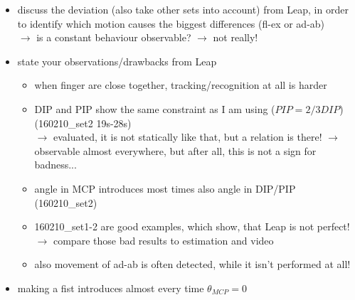 	\begin{itemize}
	
		
	\item discuss the deviation (also take other sets into account) from Leap, in order to identify which motion causes the biggest differences (fl-ex or ad-ab)\\
		$ \rightarrow $ is a constant behaviour observable? $ \rightarrow $ not really!
	\item state your observations/drawbacks from Leap 
		\begin{itemize}
		\item when finger are close together, tracking/recognition at all is harder
		\item DIP and PIP show the same constraint as I am using ($ PIP = 2/3 DIP $) (160210\_set2 19s-28s) \\
			$ \rightarrow $ evaluated, it is not statically like that, but a relation is there!
			$ \rightarrow $ observable almost everywhere, but after all, this is not a sign for badness...
			
		\item angle in MCP introduces most times also angle in DIP/PIP (160210\_set2) 			
		\item 160210\_set1-2 are good examples, which show, that Leap is not perfect!
			$ \rightarrow $	compare those bad results to estimation and video
		\item also movement of ad-ab is often detected, while it isn't performed at all!
		\end{itemize}
	\item making a fist introduces almost every time $ \theta_{MCP} = 0 $
				

\end{itemize}
